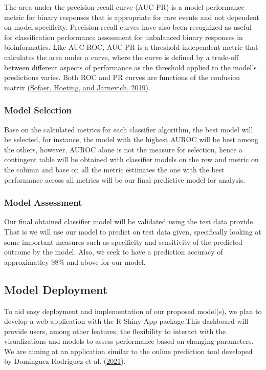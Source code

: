 \documentclass[
  10pt,
]{article}
\begin{document}
The area under the precision-recall curve (AUC-PR) is a model performance metric for binary responses that is appropriate for rare events and not dependent on model specificity. Precision-recall
curves have also been recognized as useful for classification performance assessment for unbalanced binary responses in bioinformatics. Like AUC-ROC, AUC-PR is a threshold-independent metric that calculates the area under a curve, where the curve is defined by a trade-off between different aspects of performance as the threshold applied to the model's predictions varies. Both ROC and PR curves are functions of the confusion matrix (\protect\hyperlink{ref-sofaer2019area}{Sofaer, Hoeting, and Jarnevich, 2019}).

\hypertarget{model-selection}{%
\subsubsection{Model Selection}\label{model-selection}}

Base on the calculated metrics for each classifier algorithm, the best model will be selected, for instance, the model with the highest AUROC will be best among the others, however, AUROC alone is not the measure for selection, hence a contingent table will be obtained with classifier models on the row and metric on the column and base on all the metric estimates the one with the best performance across all metrics will be our final predictive model for analysis.

\hypertarget{model-assessment}{%
\subsubsection{Model Assessment}\label{model-assessment}}

Our final obtained classifier model will be validated using the test data provide. That is we will use our model to predict on test data given, specifically looking at some important measures such as specificity and sensitivity of the predicted outcome by the model. Also, we seek to have a prediction accuracy of approximatley 98\% and above for our model.

\hypertarget{model-deployment}{%
\subsection{Model Deployment}\label{model-deployment}}

To aid easy deployment and implementation of our proposed model(s), we plan to develop a web application with the R Shiny App package.This dashboard will provide users, among other features, the flexibility to interact with the visualizations and models to assess performance based on changing parameters. We are aiming at an application similar to the online prediction tool developed by Dominguez-Rodriguez et al. (\protect\hyperlink{ref-dominguez2021bayesian}{2021}).
\end{document}
